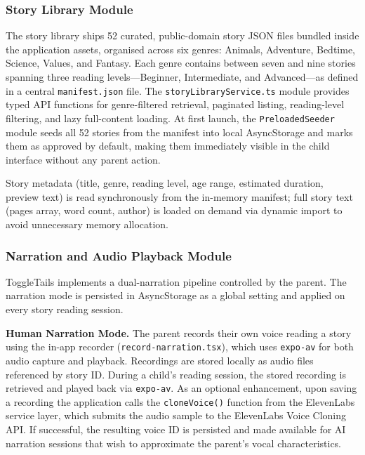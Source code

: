 \subsubsection{Story Library Module}

The story library ships 52 curated, public-domain story JSON files bundled inside the application assets, organised across six genres: Animals, Adventure, Bedtime, Science, Values, and Fantasy. Each genre contains between seven and nine stories spanning three reading levels—Beginner, Intermediate, and Advanced—as defined in a central \texttt{manifest.json} file. The \texttt{storyLibraryService.ts} module provides typed API functions for genre-filtered retrieval, paginated listing, reading-level filtering, and lazy full-content loading. At first launch, the \texttt{PreloadedSeeder} module seeds all 52 stories from the manifest into local AsyncStorage and marks them as approved by default, making them immediately visible in the child interface without any parent action.

Story metadata (title, genre, reading level, age range, estimated duration, preview text) is read synchronously from the in-memory manifest; full story text (pages array, word count, author) is loaded on demand via dynamic import to avoid unnecessary memory allocation.

\subsubsection{Narration and Audio Playback Module}

ToggleTails implements a dual-narration pipeline controlled by the parent. The narration mode is persisted in AsyncStorage as a global setting and applied on every story reading session.

\textbf{Human Narration Mode.} The parent records their own voice reading a story using the in-app recorder (\texttt{record-narration.tsx}), which uses \texttt{expo-av} for both audio capture and playback. Recordings are stored locally as audio files referenced by story ID. During a child's reading session, the stored recording is retrieved and played back via \texttt{expo-av}. As an optional enhancement, upon saving a recording the application calls the \texttt{cloneVoice()} function from the ElevenLabs service layer, which submits the audio sample to the ElevenLabs Voice Cloning API. If successful, the resulting voice ID is persisted and made available for AI narration sessions that wish to approximate the parent's vocal characteristics.

